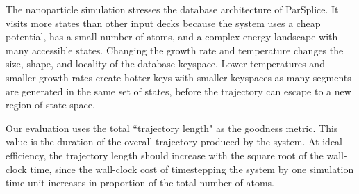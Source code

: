 The nanoparticle simulation stresses the database architecture of ParSplice. It
visits more states than other input decks because the system uses a cheap
potential, has a small number of atoms, and a complex energy landscape with
many accessible states. Changing the growth rate and temperature changes the
size, shape, and locality of the database keyspace. Lower temperatures and
smaller growth rates create hotter keys with smaller keyspaces as many segments
are generated in the same set of states, before the trajectory can escape to a
new region of state space.

Our evaluation uses the total ``trajectory length" as the goodness metric. This
value is the duration of the overall trajectory produced by the system. At
ideal efficiency, the trajectory length should increase with the square root of
the wall-clock time, since the wall-clock cost of timestepping the system by
one simulation time unit increases in proportion of the total number of atoms.
